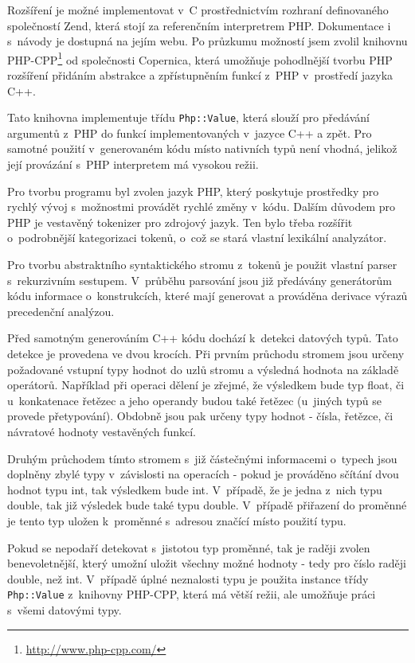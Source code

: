 \documentclass[czech]{ExcelAtFIT}
\newcommand{\function}[1]{\texttt{#1}}
\begin{document}
	Rozšíření je možné implementovat v~C pro\-střed\-nic\-tvím rozhraní definovaného společností Zend, která stojí za referenčním interpretrem PHP. Dokumentace i s~návody je dostupná na jejím webu. Po průzkumu možností jsem zvolil knihovnu PHP-CPP\footnote{\url{http://www.php-cpp.com/}} od spo\-leč\-nos\-ti Copernica, která umožňuje pohodlnější tvorbu PHP rozšíření přidáním abstrakce a zpřístupněním funkcí z~PHP v~prostředí jazyka C++.

	Tato knihovna implementuje třídu \function{Php::Value}, která slouží pro předávání argumentů z~PHP do funkcí implementovaných v~jazyce C++ a zpět. Pro samotné použití v~generovaném kódu místo nativních typů není vhodná, jelikož její provázání s~PHP interpretem má vysokou režii.

	Pro tvorbu programu byl zvolen jazyk PHP, který poskytuje prostředky pro rychlý vývoj s~možnostmi provádět rychlé změny v~kódu. Dalším důvodem pro PHP je vestavěný tokenizer pro zdrojový jazyk. Ten bylo třeba rozšířit o~podrobnější kategorizaci tokenů, o~což se stará vlastní lexikální analyzátor.

	Pro tvorbu abstraktního syntaktického stromu z~tokenů je použit vlastní parser s~rekurzivním sestupem. V~průběhu parsování jsou již předávány generátorům kódu informace o~konstrukcích, které mají generovat a prováděna derivace výrazů precedenční analýzou.

	Před samotným generováním C++ kódu dochází k~detekci datových typů. Tato detekce je provedena ve dvou krocích. Při prvním průchodu stromem jsou určeny požadované vstupní typy hodnot do uzlů stromu a výsledná hodnota na základě operátorů. Například při operaci dělení je zřejmé, že výsledkem bude typ float, či u~konkatenace řetězec a jeho operandy budou také řetězec (u~jiných typů se provede přetypování). Obdobně jsou pak určeny typy hodnot - čísla, řetězce, či návratové hodnoty vestavěných funkcí.

	Druhým průchodem tímto stromem s~již částečnými informacemi o~typech jsou doplněny zbylé typy v~zá\-vis\-los\-ti na operacích - pokud je prováděno sčítání dvou hodnot typu int, tak výsledkem bude int. V~případě, že je jedna z~nich typu double, tak již výsledek bude také typu double. V~případě přiřazení do proměnné je tento typ uložen k~proměnné s~adresou značící místo použití typu.

	Pokud se nepodaří detekovat s~jistotou typ pro\-měn\-né, tak je raději zvolen benevoletnější, který umožní uložit všechny možné hodnoty - tedy pro číslo raději double, než int. V~případě úplné neznalosti typu je použita instance třídy \function{Php::Value} z~knihovny PHP-CPP, která má větší režii, ale umožňuje práci s~všemi datovými typy\cite{phpCppPerformance}.
\end{document}
